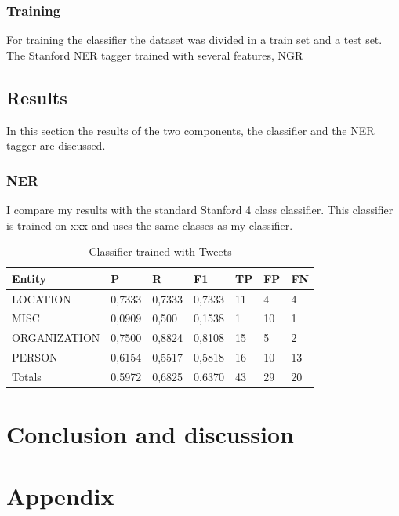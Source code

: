 \documentclass[
10pt, %
a4paper, %
oneside, %
headinclude,footinclude, %
BCOR5mm, %
]{scrartcl}
\begin{document}
\subsubsection{Training}
For training the classifier the dataset was divided in a train set and a test set. The Stanford NER tagger trained with several features, NGR


\newpage
\subsection{Results}
In this section the results of the two components, the classifier and the NER tagger are discussed.







\subsubsection{NER}
I compare my results with the standard Stanford 4 class classifier. This classifier is trained on xxx and uses the same classes as my classifier.

\begin{table}[h]
\caption[Table caption text]{Classifier trained with Tweets }
\begin{tabular}{|l|l|l|l|l|l|l|}
\hline
Entity       & P      & R      & F1     & TP & FP & FN   \\ \hline
LOCATION     & 0,7333 & 0,7333 & 0,7333 & 11 & 4  & 4    \\ \hline
MISC         & 0,0909 & 0,500  & 0,1538 & 1  & 10 & 1    \\ \hline
ORGANIZATION & 0,7500 & 0,8824 & 0,8108 & 15 & 5  & 2    \\ \hline
PERSON       & 0,6154 & 0,5517 & 0,5818 & 16 & 10 & 13   \\ \hline
Totals       & 0,5972 & 0,6825 & 0,6370 & 43 & 29 & 20 \\ \hline
\end{tabular}

\end{table}


\clearpage
\newpage
\section{Conclusion and discussion}
\lipsum[10]
\lipsum[10]

\newpage
\section{Appendix}
\end{document}
